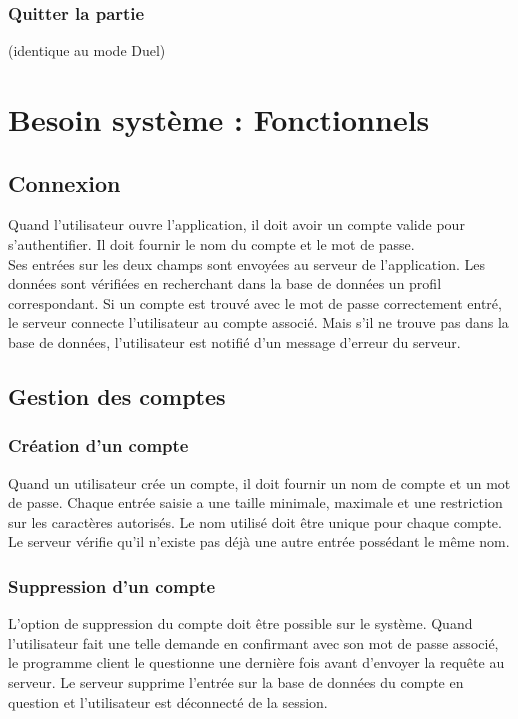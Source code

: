 \documentclass{article}
\begin{document}
\subsubsection*{Quitter la partie} (identique au mode Duel)

\newpage

\section{Besoin système : Fonctionnels}

\subsection{Connexion}

\quad Quand l'utilisateur ouvre l'application, il doit avoir un compte valide pour s'authentifier. Il doit fournir le nom du compte et le mot de passe.\\
Ses entrées sur les deux champs sont envoyées au serveur de l'application. Les données sont vérifiées en recherchant dans la base de données un profil correspondant. Si un compte est trouvé avec le mot de passe correctement entré, le serveur connecte l'utilisateur au compte associé. Mais s'il ne trouve pas dans la base de données, l'utilisateur est notifié d'un message d'erreur du serveur.

\subsection{Gestion des comptes}

\subsubsection{Création d'un compte}

Quand un utilisateur crée un compte, il doit fournir un nom de compte et un mot de passe. Chaque entrée saisie a une taille minimale, maximale et une restriction sur les caractères autorisés. Le nom utilisé doit être unique pour chaque compte.\\
Le serveur vérifie qu'il n'existe pas déjà une autre entrée possédant le même nom. 

\subsubsection{Suppression d'un compte}

L'option de suppression du compte doit être possible sur le système. Quand l'utilisateur fait une telle demande en confirmant avec son mot de passe associé, le programme client le questionne une dernière fois avant d'envoyer la requête au serveur. Le serveur supprime l'entrée sur la base de données du compte en question et l'utilisateur est déconnecté de la session.
\end{document}
